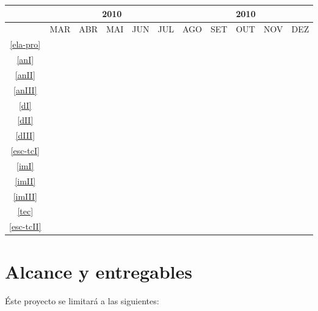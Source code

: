 \begin{table}[!htbp]
	\centering
		\begin{tabular}{|c|c|c|c|c|c|c|c|c|c|c|}
		\hline
		&\multicolumn{5}{c|}{2010}&\multicolumn{5}{c|}{2010}\\
		\hline
		&MAR&ABR&MAI&JUN&JUL&AGO&SET&OUT&NOV&DEZ\\
		\hline
		\ref{ela-pro}&\cellcolor{midgray}&&&&&&&&&\\
		\hline
		\ref{anI}&&\cellcolor{midgray}&&&&&&&&\\
		\hline
		\ref{anII}&&\cellcolor{midgray}&&&&&&&&\\
		\hline
		\ref{anIII}&&\cellcolor{midgray}&\cellcolor{midgray}&&&&&&&\\
		\hline
		\ref{dI}&&&\cellcolor{midgray}&&&&&&&\\
		\hline
		\ref{dII}&&&\cellcolor{midgray}&\cellcolor{midgray}&&&&&&\\
		\hline
		\ref{dIII}&&&&\cellcolor{midgray}&\cellcolor{midgray}&&&&&\\
		\hline
		\ref{esc-tcI}&&&\cellcolor{midgray}&\cellcolor{midgray}&\cellcolor{midgray}&&&&&\\
		\hline
		\ref{imI}&&&&&\cellcolor{midgray}&&&&&\\
		\hline
		\ref{imII}&&&&&&\cellcolor{midgray}&&&&\\
		\hline
		\ref{imIII}&&&&&&\cellcolor{midgray}&\cellcolor{midgray}&\cellcolor{midgray}&&\\
		\hline
		\ref{tec}&&&&&&&&\cellcolor{midgray}&\cellcolor{midgray}&\\
		\hline
		\ref{esc-tcII}&&&&&&&&\cellcolor{midgray}&\cellcolor{midgray}&\cellcolor{midgray}\\
		\hline
		\end{tabular}
\end{table}

\section{Alcance y entregables}
\label{alcance}
Éste proyecto se limitará a las siguientes:

